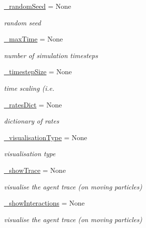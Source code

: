 \begin{DoxyCompactItemize}
\hyperlink{class_mu_mo_t_1_1_mu_mo_t_1_1_mu_mo_tmultiagent_view_a79e90c970112c845893400f85a2590dd}{\+\_\+random\+Seed} = None
\begin{DoxyCompactList}\small\item\em random seed \end{DoxyCompactList}\item 
\hyperlink{class_mu_mo_t_1_1_mu_mo_t_1_1_mu_mo_tmultiagent_view_a956572b83e957005ef90a30995891585}{\+\_\+max\+Time} = None
\begin{DoxyCompactList}\small\item\em number of simulation timesteps \end{DoxyCompactList}\item 
\hyperlink{class_mu_mo_t_1_1_mu_mo_t_1_1_mu_mo_tmultiagent_view_ad87100e87c83f6311376fa905bb9f579}{\+\_\+timestep\+Size} = None
\begin{DoxyCompactList}\small\item\em time scaling (i.\+e. \end{DoxyCompactList}\item 
\hyperlink{class_mu_mo_t_1_1_mu_mo_t_1_1_mu_mo_tmultiagent_view_a7c4303b3e2a8784a0cc16cd523069203}{\+\_\+rates\+Dict} = None
\begin{DoxyCompactList}\small\item\em dictionary of rates \end{DoxyCompactList}\item 
\hyperlink{class_mu_mo_t_1_1_mu_mo_t_1_1_mu_mo_tmultiagent_view_ae8c8d7969b8ab8f31df9d1d1d10eabb9}{\+\_\+visualisation\+Type} = None
\begin{DoxyCompactList}\small\item\em visualisation type \end{DoxyCompactList}\item 
\hyperlink{class_mu_mo_t_1_1_mu_mo_t_1_1_mu_mo_tmultiagent_view_a756f7d76f2b84a0dd60ffd6b7683dd3a}{\+\_\+show\+Trace} = None
\begin{DoxyCompactList}\small\item\em visualise the agent trace (on moving particles) \end{DoxyCompactList}\item 
\hyperlink{class_mu_mo_t_1_1_mu_mo_t_1_1_mu_mo_tmultiagent_view_ad3f953eaa70c3e4eee2dde80e57c638f}{\+\_\+show\+Interactions} = None
\begin{DoxyCompactList}\small\item\em visualise the agent trace (on moving particles) \end{DoxyCompactList}\item 

\end{DoxyCompactItemize}
